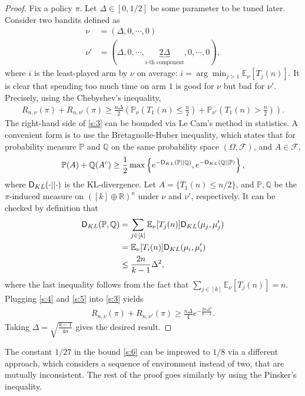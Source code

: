 \documentclass[10pt,a4paper]{amsart}
\numberwithin{equation}{section}
\theoremstyle{plain}
\theoremstyle{definition}
\def\R{{\mathbb R}}
\def\Q{{\mathbb Q}}
\def\E{{\mathbb E}}
\def\R{{\mathbb R}}
\def\P{{\mathbb P}}
\begin{document}
\begin{proof}
Fix a policy $\pi$. Let $\Delta\in [0, 1/2]$ be some parameter to be tuned later. Consider two bandits defined as
\begin{align*}
\nu &= (\Delta, 0, \cdots, 0)\\
\nu' &= (\Delta, 0, \cdots, \underbrace{2\Delta}_{\text{$i$-th component}}, 0, \cdots, 0),
\end{align*}
where $i$ is the least-played arm by $\nu$ on average: $i=\arg\min_{j>1}\E_\nu[T_j(n)]$. It is clear that spending too much time on arm $1$ is good for $\nu$ but bad for $\nu'$. Precisely, using the Chebyshev's inequality,
\begin{align}
R_{n, \nu}(\pi)+R_{n, \nu'}(\pi)\geq \frac{n\Delta}{2}\left(\P_\nu\left(T_1(n)\leq \frac{n}{2}\right)+\P_{\nu'}\left(T_1(n)> \frac{n}{2}\right)\right).\label{s:3}
\end{align}
The right-hand side of \eqref{s:3} can be bounded via Le Cam's method in statistics. A convenient form is to use the Bretagnolle-Huber inequality, which states that for probability measure $\P$ and $\Q$ on the same probability space $(\Omega, \mathcal{F})$, and $A\in\mathcal{F}$, 
\begin{align}
\P(A)+\Q(A^c)\geq\frac{1}{2}\max\left\{e^{-\textsf D_{KL}(\P||\Q)}, e^{-\textsf D_{KL}(\Q|| \P)}\right\},\label{s:4}
\end{align}
where $\textsf D_{KL}(\cdot || \cdot)$ is the KL-divergence. Let $A = \{T_1(n)\leq n/2\}$, and $\P, \Q$ be the $\pi$-induced measure on $([k]\oplus\R)^n$ under $\nu$ and $\nu'$, respectively. It can be checked by definition that 
\begin{align}
\textsf D_{KL}(\P, \Q)& = \sum_{j\in [k]}\E_\nu[T_j(n)]\textsf D_{KL}(\mu_j, \mu'_j)\label{s:5}\\
& = \E_\nu[T_i(n)]\textsf D_{KL}(\mu_i, \mu'_i)\nonumber\\
& \leq\frac{2n}{k-1}\Delta^2\nonumber,
\end{align}
where the last inequality follows from the fact that $\sum_{j\in [k]}\E_\nu[T_j(n)]=n$. Plugging \eqref{s:4} and \eqref{s:5} into \eqref{s:3} yields
\begin{align*}
R_{n, \nu}(\pi)+R_{n, \nu'}(\pi)\geq\frac{n\Delta}{4}e^{-\frac{2n\Delta^2}{k-1}}. 
\end{align*}
Taking $\Delta = \sqrt{\frac{k-1}{4n}}$ gives the desired result. 
\end{proof}
The constant $1/27$ in the bound \eqref{s:6} can be improved to $1/8$ via a different approach, which considers a sequence of environment instead of two, that are mutually inconsistent. The rest of the proof goes similarly by using the Pinsker's inequality.   
\end{document}
